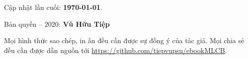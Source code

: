 \thispagestyle{empty}

Cập nhật lần cuối: \textbf{\today}.

\vspace{1cm} 

\vspace{1cm}
Bản quyền  -- 2020: \textbf{Vũ Hữu Tiệp}

Mọi hình thức sao chép, in ấn đều cần được sự đồng ý của tác giả. Mọi chia sẻ đều cần được dẫn nguồn tới \url{https://github.com/tiepvupsu/ebookMLCB}.
